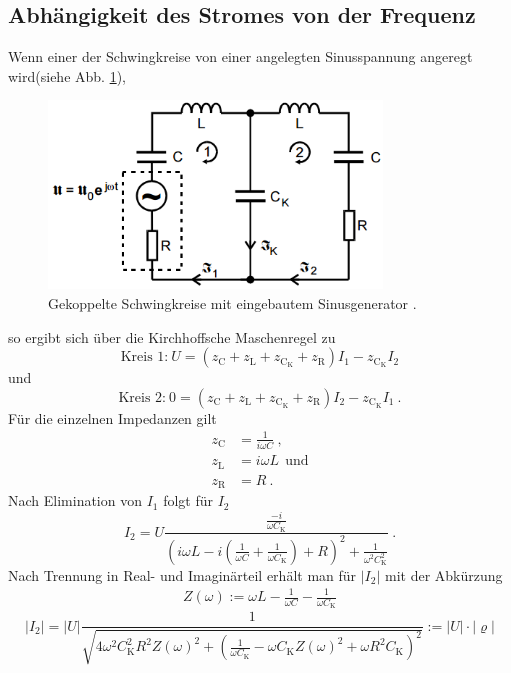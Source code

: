 \subsection{Abhängigkeit des Stromes von der Frequenz}
Wenn einer der Schwingkreise von einer angelegten Sinusspannung angeregt wird(siehe Abb. \ref{fig:AngSch}),
\begin{figure}[H]
	\centering
	\includegraphics[height=5cm]{picture/AngeregterSchwingkreis.PNG}
	\caption{Gekoppelte Schwingkreise mit eingebautem Sinusgenerator \cite{sample}.}
	\label{fig:AngSch}
\end{figure}
so ergibt sich über die Kirchhoffsche Maschenregel zu
\begin{equation}
	\text{Kreis 1:} \ U = (z_\text{C} + z_\text{L} + z_{\text{C}_\text{K}} + z_\text{R})I_1 - z_{\text{C}_\text{K}}I_2
\end{equation}
und
\begin{equation}
	\text{Kreis 2:} \ 0 = (z_\text{C} + z_\text{L} + z_{\text{C}_\text{K}} + z_\text{R})I_2 - z_{\text{C}_\text{K}}I_1 \ .
\end{equation}
Für die einzelnen Impedanzen gilt
\begin{align*}
	z_\text{C} & = \frac{1}{i \omega C} \ , \\
	z_\text{L} & = i \omega L \ \ \text{und} \\
	z_\text{R} & = R \ .
\end{align*}
Nach Elimination von $I_1$ folgt für $I_2$
\begin{equation}
	I_2 = U \frac{\frac{-i}{\omega C_\text{K}}} {\left(i \omega L - i \left(\frac{1}{\omega C} + \frac{1}{\omega C_\text{K}} \right) + R \right)^2 + \frac{1}{\omega^2 C^2_\text{K}}} \ .
\end{equation}
Nach Trennung in Real- und Imaginärteil erhält man für $|I_2|$ mit der Abkürzung
\begin{align*}
	Z(\omega) := \omega L - \frac{1}{\omega C} - \frac{1}{\omega C_\text{K}}
\end{align*}
\begin{equation}
		|I_2| = |U| \frac{1}{\sqrt{4 \omega^2 C^2_\text{K} R^2 Z(\omega)^2 + \left(\frac{1}{\omega C_\text{K}} - \omega C_\text{K} Z(\omega)^2 + \omega R^2 C_\text{K} \right)^2}} := |U| \cdot |\pmb{\varrho}|
		\label{eqn:BetragI}
\end{equation}
